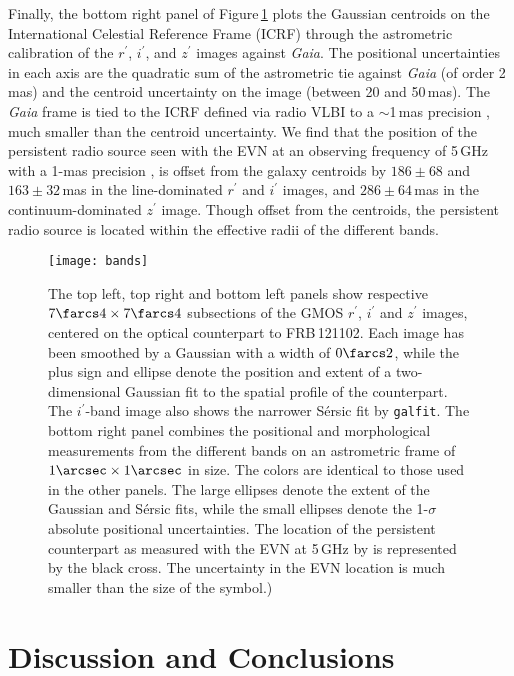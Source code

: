 \documentclass[twocolumn]{aastex61}
\begin{document}
Finally, the bottom right panel of Figure\,\ref{fig:bands} plots the Gaussian centroids on the International Celestial Reference Frame (ICRF) through the astrometric calibration of the $r^\prime$, $i^\prime$, and $z^\prime$ images against \textit{Gaia}. The positional uncertainties in each axis are the quadratic sum of the astrometric tie against \textit{Gaia} (of order 2\,mas) and the centroid uncertainty on the image (between 20 and 50\,mas). The \textit{Gaia} frame is tied to the ICRF defined via radio VLBI to a $\sim$1\,mas precision \citep{mkl+16}, much smaller than the centroid uncertainty. We find that the position of the persistent radio source seen with the EVN at an observing frequency of 5\,GHz with a 1-mas precision \citep{mph+16}, is offset from the galaxy centroids by $186\pm68$ and $163\pm32$\,mas in the line-dominated $r^\prime$ and $i^\prime$ images, and $286\pm64$\,mas in the continuum-dominated $z^\prime$ image. Though offset from the centroids, the persistent radio source is located within the effective radii of the different bands.


\begin{figure}
  \texttt{[image: bands]}
  \caption{The top left, top right and bottom left panels show
    respective $7\farcs4\times7\farcs4$ subsections of the GMOS $r^\prime$,
    $i^\prime$ and $z^\prime$ images, centered on the optical counterpart to
    FRB\,121102. Each image has been smoothed by a Gaussian with a
    width of $0\farcs2$, while the plus sign and ellipse denote the
    position and extent of a two-dimensional Gaussian fit to the
    spatial profile of the counterpart. The $i^\prime$-band image also
    shows the narrower S\'ersic fit by \texttt{galfit}. The bottom
    right panel combines the positional and morphological measurements
    from the different bands on an astrometric frame of
    $1\arcsec\times1\arcsec$ in size. The colors are identical to
    those used in the other panels. The large ellipses denote the
    extent of the Gaussian and S\'ersic fits, while the small ellipses
    denote the 1-$\sigma$ absolute positional uncertainties. The
    location of the persistent counterpart as measured with the EVN at
    5\,GHz by \citet{mph+16} is represented by the black cross. The uncertainty in the EVN location is much smaller than the size of the symbol.)}
  \label{fig:bands}
\end{figure}



\section{Discussion and Conclusions}
\label{sec:discussion}
\end{document}
